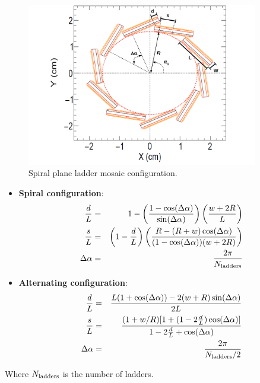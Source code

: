 \begin{figure}
  \centering
  \includegraphics[width=0.9\textwidth]{figures/Spiral_Mosaic.pdf}
  \caption{Spiral plane ladder mosaic configuration.}
  \label{fig:Spiral_Plane_ladder_mosaic}
\end{figure}

\begin{itemize}
 \item  {\bf Spiral configuration}: 
   \begin{eqnarray}
     \label{eq:spiral_overlap}
     \frac{d}{L}   &=& 1 - \left(\frac{1 - \cos(\Delta\alpha)}{\sin(\Delta\alpha)}\right) \left(\frac{w + 2R}{L}\right) \\
     \label{eq:spiral_shift}
     \frac{s}{L}   &=& \left(1 - \frac{d}{L}\right) \left( \frac{R - (R + w)\cos(\Delta\alpha)}{ (1 - \cos(\Delta\alpha))(w + 2R)} \right) \\
     \Delta\alpha  &=& \frac{2\pi}{N_{\rm ladders}}
   \end{eqnarray}
   
   \item  {\bf Alternating configuration}: 
   \begin{eqnarray}
   \label{eq:alternating_overlap}
     \frac{d}{L}   &=& \frac{L(1 + \cos(\Delta\alpha)) - 2(w + R)\sin(\Delta\alpha)}{2L} \\
     \label{eq:alternating_shift}
     \frac{s}{L}   &=& \frac{(1 + w/R) [1 + (1 - 2\frac{d}{L})\cos(\Delta\alpha)]}{1 - 2\frac{d}{L} + \cos(\Delta\alpha)} \\
     \Delta\alpha  &=& \frac{2\pi}{N_{\rm ladders}/2}
   \end{eqnarray}
\end{itemize}
\noindent
Where $N_{\rm ladders}$ is the number of ladders.


